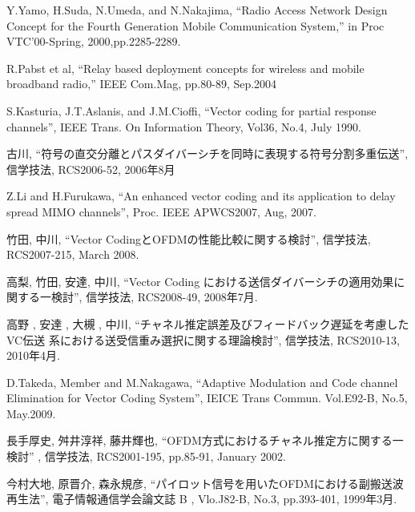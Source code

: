 \begin{thebibliography}{99}
     Y.Yamo, H.Suda, N.Umeda, and N.Nakajima,
    ``Radio Access Network Design Concept for the Fourth Generation Mobile
    Communication System,'' in Proc VTC'00-Spring, 2000,pp.2285-2289.

     R.Pabst et al, 
    “Relay based deployment concepts for wireless and mobile broadband radio,” IEEE
    Com.Mag, pp.80-89, Sep.2004

     S.Kasturia, J.T.Aslanis, and J.M.Cioffi, ``Vector coding for partial
    response channels'', IEEE Trans. On Information Theory, Vol36, No.4, July 1990.

     古川, ``符号の直交分離とパスダイバーシチを同時に表現する符号分割多重伝送'',
    信学技法, RCS2006-52, 2006年8月

     Z.Li and H.Furukawa, ``An enhanced vector coding and its application to delay
    spread MIMO channels'', Proc. IEEE APWCS2007, Aug, 2007.

     竹田, 中川, ``Vector CodingとOFDMの性能比較に関する検討'', 信学技法,
    RCS2007-215, March 2008.

     高梨, 竹田, 安達, 中川, ``Vector Coding における送信ダイバーシチの適用効果に
    関する一検討'', 信学技法, RCS2008-49, 2008年7月.

     高野 , 安達 , 大槻 , 中川, ``チャネル推定誤差及びフィードバック遅延を考慮したVC伝送
    系における送受信重み選択に関する理論検討'', 信学技法, RCS2010-13, 2010年4月.

     D.Takeda, Member and M.Nakagawa, ``Adaptive Modulation and Code channel
    Elimination for Vector Coding System'', IEICE Trans Commun. Vol.E92-B, No.5, May.2009.

     長手厚史, 舛井淳祥, 藤井輝也, ``OFDM方式におけるチャネル推定方に関する一検討''
    , 信学技法, RCS2001-195, pp.85-91, January 2002.

     今村大地, 原晋介, 森永規彦, ``パイロット信号を用いたOFDMにおける副搬送波再生法'',
     電子情報通信学会論文誌 B , Vlo.J82-B, No.3, pp.393-401, 1999年3月.

\end{thebibliography}
